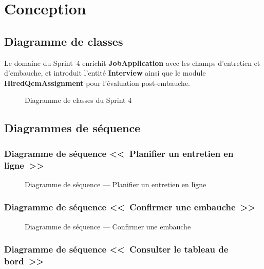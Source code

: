 \section{Conception}

\subsection{Diagramme de classes}

Le domaine du Sprint~4 enrichit \textbf{JobApplication} avec les champs
d'entretien et d'embauche, et introduit l'entité \textbf{Interview} ainsi
que le module \textbf{HiredQcmAssignment} pour l'évaluation post-embauche.

\begin{figure}[H]
  \centering
  \caption{Diagramme de classes du Sprint 4}
  \label{fig:class-sprint4}
\end{figure}


\subsection{Diagrammes de séquence}

\subsubsection{Diagramme de séquence <<~Planifier un entretien en ligne~>>}

\begin{figure}[H]
  \centering
  \caption{Diagramme de séquence --- Planifier un entretien en ligne}
  \label{fig:seq-online-interview}
\end{figure}

\subsubsection{Diagramme de séquence <<~Confirmer une embauche~>>}

\begin{figure}[H]
  \centering
  \caption{Diagramme de séquence --- Confirmer une embauche}
  \label{fig:seq-hire}
\end{figure}

\subsubsection{Diagramme de séquence <<~Consulter le tableau de bord~>>}


